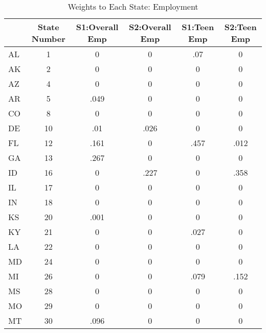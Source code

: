 \begin{table}[htbp]\centering
\caption{Weights to Each State: Employment}
\begin{tabular}{l*{5}{c}}
\toprule
            &State Number&S1:Overall Emp&S2:Overall Emp& S1:Teen Emp& S2:Teen Emp\\
\midrule
AL          &           1&           0&           0&         .07&           0\\
AK          &           2&           0&           0&           0&           0\\
AZ          &           4&           0&           0&           0&           0\\
AR          &           5&        .049&           0&           0&           0\\
CO          &           8&           0&           0&           0&           0\\
DE          &          10&         .01&        .026&           0&           0\\
FL          &          12&        .161&           0&        .457&        .012\\
GA          &          13&        .267&           0&           0&           0\\
ID          &          16&           0&        .227&           0&        .358\\
IL          &          17&           0&           0&           0&           0\\
IN          &          18&           0&           0&           0&           0\\
KS          &          20&        .001&           0&           0&           0\\
KY          &          21&           0&           0&        .027&           0\\
LA          &          22&           0&           0&           0&           0\\
MD          &          24&           0&           0&           0&           0\\
MI          &          26&           0&           0&        .079&        .152\\
MS          &          28&           0&           0&           0&           0\\
MO          &          29&           0&           0&           0&           0\\
MT          &          30&        .096&           0&           0&           0\\

\end{tabular}
\end{table}
